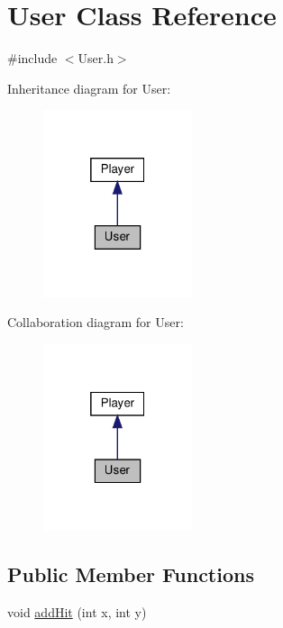 \hypertarget{classUser}{}\section{User Class Reference}
\label{classUser}


{\ttfamily \#include $<$User.\+h$>$}



Inheritance diagram for User\+:
\nopagebreak
\begin{figure}[H]
\begin{center}
\leavevmode
\includegraphics[width=124pt]{classUser__inherit__graph}
\end{center}
\end{figure}


Collaboration diagram for User\+:
\nopagebreak
\begin{figure}[H]
\begin{center}
\leavevmode
\includegraphics[width=124pt]{classUser__coll__graph}
\end{center}
\end{figure}
\subsection*{Public Member Functions}
\begin{DoxyCompactItemize}
\item 
void \hyperlink{classUser_acc17e3c44688c5f9f00f0a297ac4b7dc}{add\+Hit} (int x, int y)
\end{DoxyCompactItemize}


